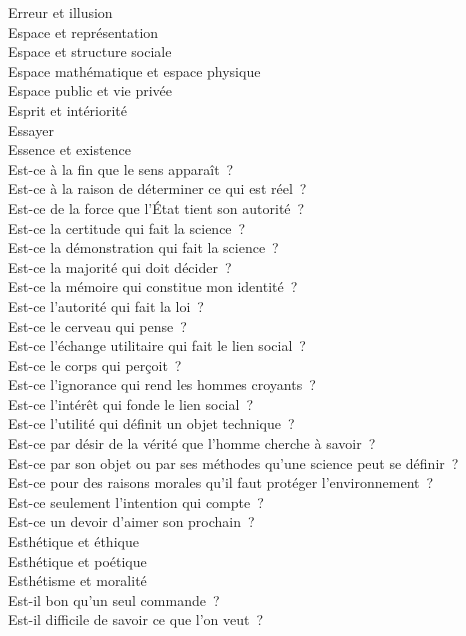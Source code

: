 \documentclass[a4paper,12pt]{article}
\begin{document}
Erreur et illusion \\
Espace et représentation \\
Espace et structure sociale \\
Espace mathématique et espace physique \\
Espace public et vie privée \\
Esprit et intériorité \\
Essayer \\
Essence et existence \\
Est-ce à la fin que le sens apparaît ? \\
Est-ce à la raison de déterminer ce qui est réel ? \\
Est-ce de la force que l'État tient son autorité ? \\
Est-ce la certitude qui fait la science ? \\
Est-ce la démonstration qui fait la science ? \\
Est-ce la majorité qui doit décider ? \\
Est-ce la mémoire qui constitue mon identité ? \\
Est-ce l'autorité qui fait la loi ? \\
Est-ce le cerveau qui pense ? \\
Est-ce l'échange utilitaire qui fait le lien social ? \\
Est-ce le corps qui perçoit ? \\
Est-ce l'ignorance qui rend les hommes croyants ? \\
Est-ce l'intérêt qui fonde le lien social ? \\
Est-ce l'utilité qui définit un objet technique ? \\
Est-ce par désir de la vérité que l'homme cherche à savoir ? \\
Est-ce par son objet ou par ses méthodes qu'une science peut se définir ? \\
Est-ce pour des raisons morales qu'il faut protéger l'environnement ? \\
Est-ce seulement l'intention qui compte ? \\
Est-ce un devoir d'aimer son prochain ? \\
Esthétique et éthique \\
Esthétique et poétique \\
Esthétisme et moralité \\
Est-il bon qu'un seul commande ? \\
Est-il difficile de savoir ce que l'on veut ? \\
\end{document}
